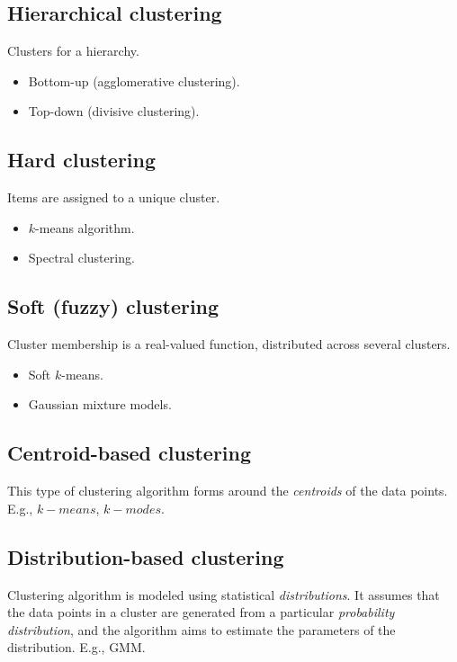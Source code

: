 \documentclass[
	number={6},
	title={Clustering}
]{cs584notes}
\begin{document}
\subsection{Hierarchical clustering}\label{subsec:hierarchical-clustering}
Clusters for a hierarchy.
\begin{itemize}
	\item Bottom-up (agglomerative clustering).
	\item Top-down (divisive clustering).
\end{itemize}

\subsection{Hard clustering}\label{subsec:hard-clustering}
Items are assigned to a unique cluster.
\begin{itemize}
	\item $k$-means algorithm.
	\item Spectral clustering.
\end{itemize}

\subsection{Soft (fuzzy) clustering}\label{subsec:soft-clustering}
Cluster membership is a real-valued function, distributed across several clusters.
\begin{itemize}
	\item Soft $k$-means.
	\item Gaussian mixture models.
\end{itemize}

\subsection{Centroid-based clustering}\label{subsec:centroid-based-clustering}
This type of clustering algorithm forms around the \emph{centroids} of the data points.
E.g., $k-means$, $k-modes$.

\subsection{Distribution-based clustering}\label{subsec:distribution-based-clustering}
Clustering algorithm is modeled using statistical \emph{distributions}.
It assumes that the data points in a cluster are generated from a particular \emph{probability distribution}, and the algorithm aims to estimate the parameters of the distribution.
E.g., GMM\@.
\end{document}
